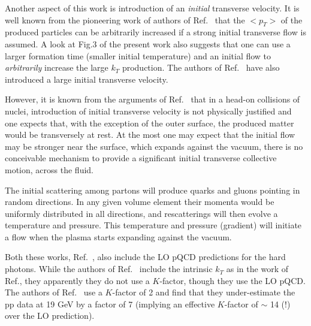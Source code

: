 Another aspect of this work is introduction of an {\em initial}
transverse velocity. It is well known from the pioneering work of
authors of Ref.~\cite{hydro} that the $<p_T>$ of the produced
particles can be arbitrarily increased if a strong initial transverse
flow is assumed. A look at Fig.3 of the present work also
suggests that one can use a larger formation time (smaller initial 
temperature) and an initial flow to {\em arbitrarily} increase the
large $k_T$ production. The authors of Ref.~\cite{rus} have also
introduced a large initial transverse velocity. 

However, it is known from the arguments of Ref.~\cite{hydro} that
in a head-on collisions of nuclei, introduction of initial transverse
velocity is not physically justified and one expects that, with the
exception of the outer surface, the produced matter would be
transversely at rest. At the most one may expect that the initial flow
may be stronger near the surface, which expands against the
vacuum, there is no conceivable mechanism to provide a significant
initial transverse collective motion, across the fluid.

The initial scattering among partons
will produce quarks and gluons pointing in random directions. In any
given volume element their momenta would be uniformly distributed in 
all directions, and rescatterings will then evolve a temperature and
pressure. This temperature and pressure (gradient) will initiate a
flow when the plasma starts expanding against the vacuum. 

Both these works, Ref.~\cite{jane,rus}, also include the
LO pQCD  predictions for the hard photons. While the authors of Ref.~\cite{jane}
include the intrinsic $k_T$ as in the work of Ref.\cite{wong}, they 
apparently they do not use a $K$-factor, though they use the LO pQCD.
 The authors of Ref.~\cite{rus} 
use a $K$-factor of 2 and find that they under-estimate the pp data
at  19 GeV by a factor of 7 (implying an effective $K$-factor
of $\sim$ 14 (!) over the LO prediction).


